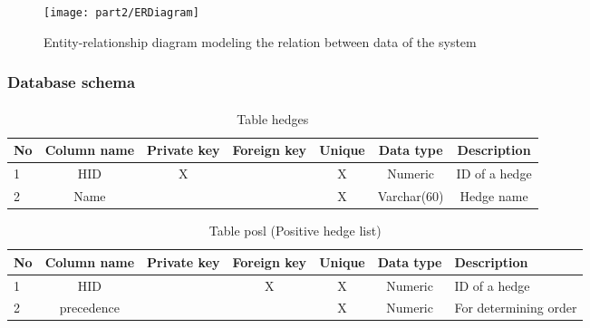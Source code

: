 \documentclass[../gr-final.tex]{subfiles}
\begin{document}
\begin{figure}[H]
\texttt{[image: part2/ERDiagram]}
\caption{Entity-relationship diagram modeling the relation
between data of the system}
\end{figure}
\subsubsection{Database schema}
\paragraph{}


\begin{table}[H]
\begin{tabular}{|l|c|c|c|c|c|c|}
\hline
      No & Column name & Private key & Foreign key & Unique & Data type   & Description   \\ \hline
      1  & HID         & X           & ~           & X      & Numeric     & ID of a hedge \\ \hline
      2  & Name        & ~           & ~           & X      & Varchar(60) & Hedge name    \\ \hline
\end{tabular}
\caption {Table hedges}
\end{table}

\begin{table}[H]
        \begin{tabular}{|l|c|c|c|c|c|p{2cm}|}
    \hline
    No & Column name & Private key & Foreign key & Unique & Data type & Description           \\ \hline
    1  & HID         & ~           & X           & X      & Numeric   & ID of a hedge         \\ \hline
    2  & precedence  & ~           & ~           & X      & Numeric   & For determining order \\ \hline
    \end{tabular}
    \caption {Table posl (Positive hedge list)}
\end{table}
\end{document}
